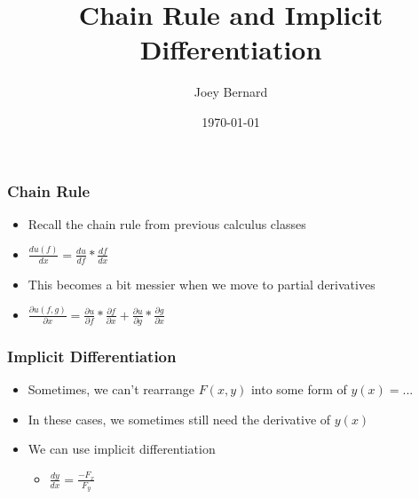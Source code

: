 \documentclass{beamer}
\title{Chain Rule and Implicit Differentiation}
\author{Joey Bernard}
\institute{University of New Brunswick}
\date{\today}
\begin{document}
\begin{frame}
  \titlepage
\end{frame}

\begin{frame}
  \frametitle{Chain Rule}
  \begin{itemize}
  \item Recall the chain rule from previous calculus classes
  \item $\frac{du(f)}{dx} = \frac{du}{df} * \frac{df}{dx}$
  \item This becomes a bit messier when we move to partial derivatives
  \item $\frac{\partial u(f,g)}{\partial x} = \frac{\partial u}{\partial f} * \frac{\partial f}{\partial x} + \frac{\partial u}{\partial g} * \frac{\partial g}{\partial x}$
  \end{itemize}
\end{frame}

\begin{frame}
  \frametitle{Implicit Differentiation}
  \begin{itemize}
  \item Sometimes, we can't rearrange $F(x,y)$ into some form of $y(x) = ...$
  \item In these cases, we sometimes still need the derivative of $y(x)$
  \item We can use implicit differentiation
    \begin{itemize}
    \item $\frac{dy}{dx} = \frac{-F_x}{F_y}$
    \end{itemize}
  \end{itemize}
\end{frame}
\end{document}
